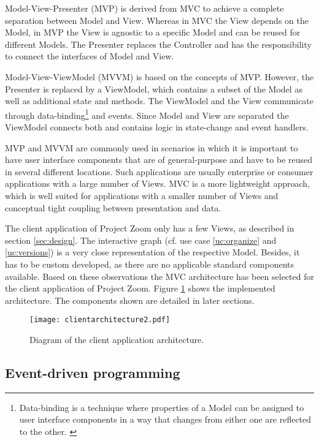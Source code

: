 Model-View-Presenter (MVP) is derived from MVC to achieve a complete separation between Model and View. Whereas in MVC the View depends on the Model, in MVP the View is agnostic to a specific Model and can be reused for different Models. The Presenter replaces the Controller and has the responsibility to connect the interfaces of Model and View. 

Model-View-ViewModel (MVVM) is based on the concepts of MVP. However, the Presenter is replaced by a ViewModel, which contains a subset of the Model as well as additional state and methods. The ViewModel and the View communicate through data-binding\footnote{Data-binding is a technique where properties of a Model can be assigned to user interface components in a way that changes from either one are reflected to the other. \cite{Bent_2004}} and events. Since Model and View are separated the ViewModel connects both and contains logic in state-change and event handlers.

MVP and MVVM are commonly used in scenarios in which it is important to have user interface components that are of general-purpose and have to be reused in several different locations. Such applications are usually enterprise or consumer applications with a large number of Views. MVC is a more lightweight approach, which is well suited for applications with a smaller number of Views and conceptual tight coupling between presentation and data. \cite{Osmani_2012}

The client application of Project Zoom only has a few Views, as described in section \ref{sec:design}. The interactive graph (cf. use case \ref{uc:organize} and \ref{uc:versions}) is a very close representation of the respective Model. Besides, it has to be custom developed, as there are no applicable standard components available. Based on these observations the MVC architecture has been selected for the client application of Project Zoom. Figure \ref{fig:arch} shows the implemented architecture. The components shown are detailed in later sections.

\begin{figure}
\texttt{[image: clientarchitecture2.pdf]}
\caption{Diagram of the client application architecture.}
\label{fig:arch}
\end{figure}


\subsection{Event-driven programming}
\label{sec:eventbased}

